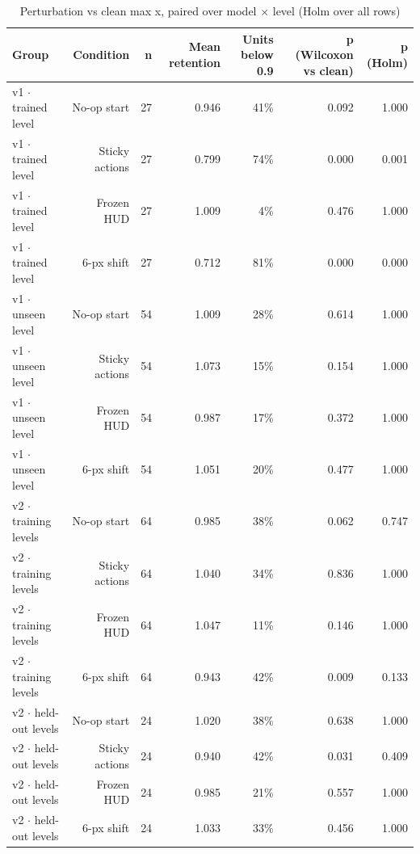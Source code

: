 \begin{table}[t]
\centering
\caption{Perturbation vs clean max x, paired over model $\times$ level (Holm over all rows)}
\label{tab:robustness_statistics}
\begin{tabular}{lrrrrrr}
\toprule
Group & Condition & n & Mean retention & Units below 0.9 & p (Wilcoxon vs clean) & p (Holm) \\
\midrule
v1 $\cdot$ trained level & No-op start & 27 & 0.946 & 41\% & 0.092 & 1.000 \\
v1 $\cdot$ trained level & Sticky actions & 27 & 0.799 & 74\% & 0.000 & 0.001 \\
v1 $\cdot$ trained level & Frozen HUD & 27 & 1.009 & 4\% & 0.476 & 1.000 \\
v1 $\cdot$ trained level & 6-px shift & 27 & 0.712 & 81\% & 0.000 & 0.000 \\
v1 $\cdot$ unseen level & No-op start & 54 & 1.009 & 28\% & 0.614 & 1.000 \\
v1 $\cdot$ unseen level & Sticky actions & 54 & 1.073 & 15\% & 0.154 & 1.000 \\
v1 $\cdot$ unseen level & Frozen HUD & 54 & 0.987 & 17\% & 0.372 & 1.000 \\
v1 $\cdot$ unseen level & 6-px shift & 54 & 1.051 & 20\% & 0.477 & 1.000 \\
v2 $\cdot$ training levels & No-op start & 64 & 0.985 & 38\% & 0.062 & 0.747 \\
v2 $\cdot$ training levels & Sticky actions & 64 & 1.040 & 34\% & 0.836 & 1.000 \\
v2 $\cdot$ training levels & Frozen HUD & 64 & 1.047 & 11\% & 0.146 & 1.000 \\
v2 $\cdot$ training levels & 6-px shift & 64 & 0.943 & 42\% & 0.009 & 0.133 \\
v2 $\cdot$ held-out levels & No-op start & 24 & 1.020 & 38\% & 0.638 & 1.000 \\
v2 $\cdot$ held-out levels & Sticky actions & 24 & 0.940 & 42\% & 0.031 & 0.409 \\
v2 $\cdot$ held-out levels & Frozen HUD & 24 & 0.985 & 21\% & 0.557 & 1.000 \\
v2 $\cdot$ held-out levels & 6-px shift & 24 & 1.033 & 33\% & 0.456 & 1.000 \\
\bottomrule
\end{tabular}
\end{table}

